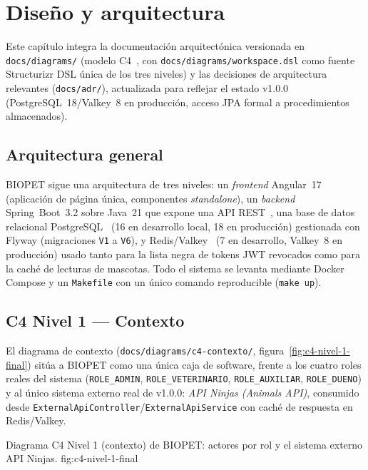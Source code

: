 \chapter{Dise\~no y arquitectura}
\label{cap:arquitectura}

Este cap\'itulo integra la documentaci\'on arquitect\'onica versionada en
\texttt{docs/diagrams/} (modelo C4~\cite{c4-model}, con
\texttt{docs/diagrams/workspace.dsl} como fuente Structurizr DSL \'unica de
los tres niveles) y las decisiones de arquitectura relevantes
(\texttt{docs/adr/}), actualizada para reflejar el estado v1.0.0
(PostgreSQL~18/Valkey~8 en producci\'on, acceso JPA formal a procedimientos
almacenados).

\section{Arquitectura general}

BIOPET sigue una arquitectura de tres niveles: un \emph{frontend} Angular~17
(aplicaci\'on de p\'agina \'unica, componentes \emph{standalone}), un
\emph{backend} Spring~Boot~3.2 sobre Java~21 que expone una API
REST~\cite{spring-boot-docs}, una base de datos relacional
PostgreSQL~\cite{postgresql-docs} (16 en desarrollo local, 18 en
producci\'on) gestionada con Flyway (migraciones \texttt{V1} a
\texttt{V6}), y Redis/Valkey~\cite{redis-docs} (7 en desarrollo, Valkey~8
en producci\'on) usado tanto para la lista negra de tokens JWT revocados
como para la cach\'e de lecturas de mascotas. Todo el sistema se
levanta mediante Docker Compose y un \texttt{Makefile} con un \'unico
comando reproducible (\texttt{make up}).

\section{C4 Nivel 1 --- Contexto}
\label{sec:c4-nivel-1}

El diagrama de contexto (\texttt{docs/diagrams/c4-contexto/},
figura~\ref{fig:c4-nivel-1-final}) sit\'ua a BIOPET como una \'unica caja
de software, frente a los cuatro roles reales
del sistema (\texttt{ROLE\_ADMIN}, \texttt{ROLE\_VETERINARIO},
\texttt{ROLE\_AUXILIAR}, \texttt{ROLE\_DUENO}) y al \'unico sistema externo
real de v1.0.0: \emph{API Ninjas (Animals API)}, consumido desde
\texttt{ExternalApiController}/\texttt{ExternalApiService} con cach\'e de
respuesta en Redis/Valkey.

%
{Diagrama C4 Nivel 1 (contexto) de BIOPET: actores por rol y el sistema externo API Ninjas.}%
{fig:c4-nivel-1-final}


